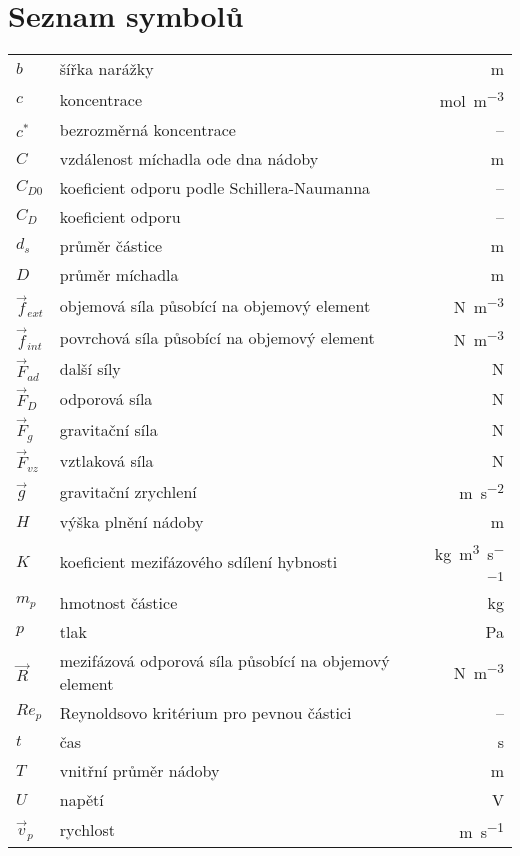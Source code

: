 \chapter*{Seznam symbolů}

\renewcommand\arraystretch{1.5}
\begin{tabularx}{\textwidth}{@{}p{1.0cm} X r@{}}
	$b$ & šířka narážky & \si{\meter} \\
	$c$ & koncentrace & \si{\mole\per\cubic\meter} \\
	$c^{*}$ & bezrozměrná koncentrace & --\\
	$C$ & vzdálenost míchadla ode dna nádoby & \si{\meter} \\
	$C_{D0}$ & koeficient odporu podle Schillera-Naumanna & -- \\ 
	$C_{D}$ & koeficient odporu &  -- \\
	$d_{s}$ & průměr částice & \si{\meter} \\
	$D$ & průměr míchadla & \si{\meter} \\
	
	$\vec{f}_{ext}$ & objemová síla působící na objemový element & \si{\newton\per\cubic\meter} \\
	$\vec{f}_{int}$ & povrchová síla působící na objemový element & \si{\newton\per\cubic\meter} \\
	$\vec{F}_{ad}$ & další síly & \si{\newton} \\
	$\vec{F}_{D}$ & odporová síla & \si{\newton} \\
	$\vec{F}_{g}$ & gravitační síla & \si{\newton} \\
	$\vec{F}_{vz}$ & vztlaková síla & \si{\newton} \\
	$\vec{g}$ & gravitační zrychlení & \si{\meter\per\second\squared} \\
	$H$ & výška plnění nádoby & \si{\meter} \\
	$K$ & koeficient mezifázového sdílení hybnosti & \si{\kilogram\per\cubic\meter\per\second} \\
	$m_{p}$ & hmotnost částice & \si{\kilogram} \\
	
	$p$ & tlak & \si{\pascal} \\
	$\vec{R}$ & mezifázová odporová síla působící na objemový element & \si{\newton\per\cubic\meter} \\
	$Re_{p}$ & Reynoldsovo kritérium pro pevnou částici &  --\\
	$t$ & čas & \si{\second} \\
	$T$ & vnitřní průměr nádoby & \si{\meter} \\
	$U$ & napětí & \si{\volt} \\
	$\vec{v}_{p}$ & rychlost & \si{\meter\per\second} \\
\end{tabularx}


